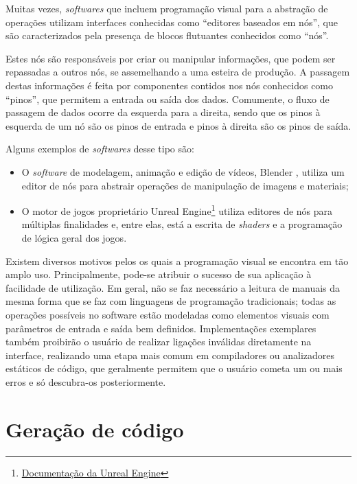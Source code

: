 \documentclass[
	12pt,				%
	openright,			%
	oneside,			%
	a4paper,			%
	main=brazil,
	english,			%
	]{ufsj-abntex2}
\begin{document}
Muitas vezes, \textit{softwares} que incluem programação visual para a abstração de operações utilizam interfaces conhecidas como ``editores baseados em nós'', que são caracterizados pela presença de blocos flutuantes conhecidos como ``nós''.

Estes nós são responsáveis por criar ou manipular informações, que podem ser repassadas a outros nós, se assemelhando a uma esteira de produção. A passagem destas informações é feita por componentes contidos nos nós conhecidos como ``pinos'', que permitem a entrada ou saída dos dados. Comumente, o fluxo de passagem de dados ocorre da esquerda para a direita, sendo que os pinos à esquerda de um nó são os pinos de entrada e pinos à direita são os pinos de saída.

Alguns exemplos de \textit{softwares} desse tipo são:

\begin{itemize}
    \item O \textit{software} de modelagem, animação e edição de vídeos, Blender \cite{blender}, utiliza um editor de nós para abstrair operações de manipulação de imagens e materiais;

    \item O motor de jogos proprietário Unreal Engine\footnote{\href{https://www.unrealengine.com/}{Documentação da Unreal Engine}} utiliza editores de nós para múltiplas finalidades e, entre elas, está a escrita de \textit{shaders} e a programação de lógica geral dos jogos.
\end{itemize}

Existem diversos motivos pelos os quais a programação visual se encontra em tão amplo uso. Principalmente, pode-se atribuir o sucesso de sua aplicação à facilidade de utilização. Em geral, não se faz necessário a leitura de manuais da mesma forma que se faz com linguagens de programação tradicionais; todas as operações possíveis no software estão modeladas como elementos visuais com parâmetros de entrada e saída bem definidos. Implementações exemplares também proibirão o usuário de realizar ligações inválidas diretamente na interface, realizando uma etapa mais comum em compiladores ou analizadores estáticos de código, que geralmente permitem que o usuário cometa um ou mais erros e só descubra-os posteriormente.

\section{Geração de código}
\end{document}

